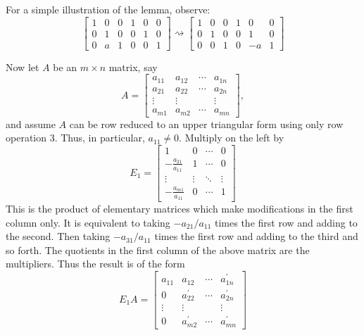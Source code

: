 \documentclass{ximera}
\begin{document}
For a simple illustration of the lemma, observe:
\begin{equation*}
\left[\begin{array}{ccc|ccc}
1 & 0 & 0 & 1 & 0 & 0 \\
0 & 1 & 0 & 0 & 1 & 0 \\
0 & a & 1 & 0 & 0 & 1
\end{array}\right]
\rightsquigarrow 
\left[\begin{array}{ccc|ccc}
1 & 0 & 0 & 1 & 0 & 0 \\
0 & 1 & 0 & 0 & 1 & 0 \\
0 & 0 & 1 & 0 & -a & 1
\end{array}\right]
\end{equation*}

Now let $A$ be an $m\times n$ matrix, say
\begin{equation*}
A=
\begin{bmatrix}
a_{11} & a_{12} & \cdots & a_{1n} \\
a_{21} & a_{22} & \cdots & a_{2n} \\
\vdots & \vdots &  & \vdots \\
a_{m1} & a_{m2} & \cdots & a_{mn}
\end{bmatrix},
\end{equation*}
and assume $A$ can be row reduced to an upper triangular form using only row
operation 3. Thus, in particular, $a_{11}\neq 0$. Multiply on the left by 
\begin{equation*}
E_{1}=
\begin{bmatrix}
1 & 0 & \cdots & 0 \\
-
\frac{a_{21}}{a_{11}} & 1 & \cdots & 0 \\
\vdots & \vdots & \ddots & \vdots \\
-\frac{a_{m1}}{a_{11}} & 0 & \cdots & 1
\end{bmatrix}
\end{equation*}
This is the product of elementary matrices which make modifications in the
first column only. It is equivalent to taking $-a_{21}/a_{11}$ times the
first row and adding to the second. Then taking $-a_{31}/a_{11}$ times the
first row and adding to the third and so forth. The quotients in the first
column of the above matrix are the multipliers. Thus the result is of the
form
\begin{equation*}
E_{1}A=
\begin{bmatrix}
a_{11} & a_{12} & \cdots & a_{1n}^{\prime } \\
0 & a_{22}^{\prime } & \cdots & a_{2n}^{\prime } \\
\vdots & \vdots &  & \vdots \\
0 & a_{m2}^{\prime } & \cdots & a_{mn}^{\prime }
\end{bmatrix}
\end{equation*}
\end{document}
